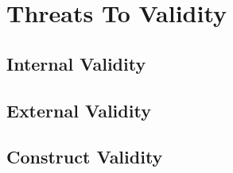 































\section{Threats To Validity}
\label{sub:threats_to_validity}

\subsection{Internal Validity}
\label{sub:internal_validty}

\subsection{External Validity}
\label{sub:external_validity}

\subsection{Construct Validity} %
\label{sub:construct_validity}

